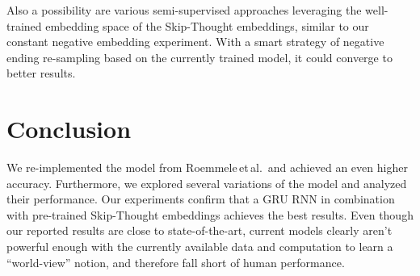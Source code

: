 \documentclass{article}
\begin{document}
Also a possibility are various semi-supervised approaches leveraging the well-trained embedding space of the Skip-Thought embeddings,
similar to our constant negative embedding experiment. With a smart strategy of negative ending re-sampling based on the currently trained model, it could converge to better results.

\section{Conclusion}\label{sec:conclusion}
We re-implemented the model from Roemmele\,et\,al.\,\citep{Roemmele2017AnTest} and achieved an even higher accuracy. Furthermore, we explored several variations of the model and analyzed their performance. Our experiments confirm that a GRU RNN in combination with pre-trained Skip-Thought embeddings achieves the best results. Even though our reported results are close to state-of-the-art, current models clearly aren't powerful enough with the currently available data and computation to learn a ``world-view'' notion, and therefore fall short of human performance.


\end{document}
